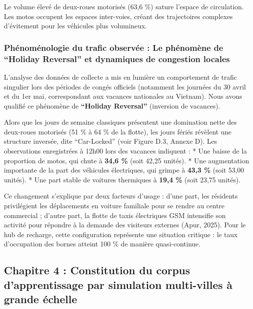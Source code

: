 \documentclass[10pt, a4paper]{article}
\begin{document}
Le volume élevé de deux-roues motorisés (63,6 \%) sature l'espace de
circulation. Les motos occupent les espaces inter-voies, créant des
trajectoires complexes d'évitement pour les véhicules plus volumineux.

\subsubsection{Phénoménologie du trafic observée : Le phénomène de
``Holiday Reversal'' et dynamiques de congestion
locales}\label{phuxe9nomuxe9nologie-du-trafic-observuxe9e-le-phuxe9nomuxe8ne-de-holiday-reversal-et-dynamiques-de-congestion-locales}

L'analyse des données de collecte a mis en lumière un comportement de
trafic singulier lors des périodes de congés officiels (notamment les
journées du 30 avril et du 1er mai, correspondant aux vacances
nationales au Vietnam). Nous avons qualifié ce phénomène de
\textbf{``Holiday Reversal''} (inversion de vacances).

Alors que les jours de semaine classiques présentent une domination
nette des deux-roues motorisés (51 \% à 64 \% de la flotte), les jours
fériés révèlent une structure inversée, dite ``Car-Locked'' (voir Figure
D.3, Annexe D). Les observations enregistrées à 12h00 lors des vacances
indiquent : * Une baisse de la proportion de motos, qui chute à
\textbf{34,6 \%} (soit 42,25 unités). * Une augmentation importante de
la part des véhicules électriques, qui grimpe à \textbf{43,3 \%} (soit
53,00 unités). * Une part stable de voitures thermiques à \textbf{19,4
\%} (soit 23,75 unités).

Ce changement s'explique par deux facteurs d'usage : d'une part, les
résidents privilégient les déplacements en voiture familiale pour se
rendre au centre commercial ; d'autre part, la flotte de taxis
électriques GSM intensifie son activité pour répondre à la demande des
visiteurs externes (Apur, 2025). Pour le hub de recharge, cette
configuration représente une situation critique : le taux d'occupation
des bornes atteint 100 \% de manière quasi-continue.

\newpage

\subsection{Chapitre 4 : Constitution du corpus d'apprentissage par
simulation multi-villes à grande
échelle}\label{chapitre-4-constitution-du-corpus-dapprentissage-par-simulation-multi-villes-uxe0-grande-uxe9chelle}
\end{document}
